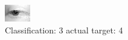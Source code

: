 \begin{figure}[h!]
\begin{center}
\includegraphics[width=0.60\columnwidth]{figures/ID2713_class_3_target_4.png}
\end{center}
\caption{ Classification: 3 actual target: 4}
\label{fig:ID2713_class_3_target_4}
\end{figure}
